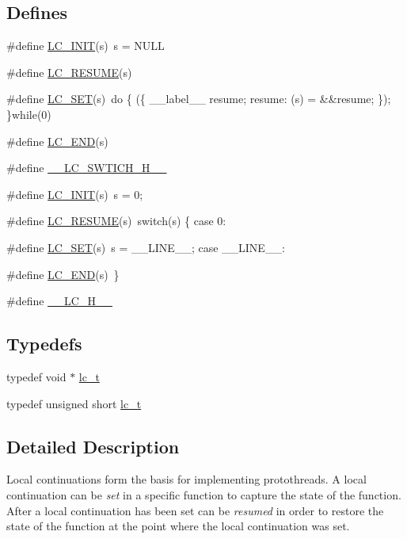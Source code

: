\subsection*{Defines}
\begin{DoxyCompactItemize}
\item 
\#define \hyperlink{group__lc_ga2c1bb4fa6d7a6ff951a41c73fc721109}{LC\_\-INIT}(s)~s = NULL
\item 
\#define \hyperlink{group__lc_ga1ec8b8f4710dce1fa7fb87d3a31541ae}{LC\_\-RESUME}(s)
\item 
\#define \hyperlink{group__lc_gad8eec328a4868d767f0c00c8d1c6cfc1}{LC\_\-SET}(s)~do \{ (\{ \_\-\_\-label\_\-\_\- resume; resume: (s) = \&\&resume; \}); \}while(0)
\item 
\#define \hyperlink{group__lc_gaca51ceb2f5d855dfde55bcedf8d3b92d}{LC\_\-END}(s)
\item 
\#define \hyperlink{group__lc_ga44311ecc30759ca38b4069182247bdae}{\_\-\_\-LC\_\-SWTICH\_\-H\_\-\_\-}
\item 
\#define \hyperlink{group__lc_ga2c1bb4fa6d7a6ff951a41c73fc721109}{LC\_\-INIT}(s)~s = 0;
\item 
\#define \hyperlink{group__lc_ga1ec8b8f4710dce1fa7fb87d3a31541ae}{LC\_\-RESUME}(s)~switch(s) \{ case 0:
\item 
\#define \hyperlink{group__lc_gad8eec328a4868d767f0c00c8d1c6cfc1}{LC\_\-SET}(s)~s = \_\-\_\-LINE\_\-\_\-; case \_\-\_\-LINE\_\-\_\-:
\item 
\#define \hyperlink{group__lc_gaca51ceb2f5d855dfde55bcedf8d3b92d}{LC\_\-END}(s)~\}
\item 
\#define \hyperlink{group__lc_ga28687499cf5b5681fb09ba1c184e09a8}{\_\-\_\-LC\_\-H\_\-\_\-}
\end{DoxyCompactItemize}
\subsection*{Typedefs}
\begin{DoxyCompactItemize}
\item 
typedef void $\ast$ \hyperlink{group__lc_ga2bdc4b7b4038454a79f1b2a94a6d2a98}{lc\_\-t}
\item 
typedef unsigned short \hyperlink{group__lc_ga3983e0c026396d5c4506779d770007ba}{lc\_\-t}
\end{DoxyCompactItemize}


\subsection{Detailed Description}
Local continuations form the basis for implementing protothreads. A local continuation can be {\itshape set\/} in a specific function to capture the state of the function. After a local continuation has been set can be {\itshape resumed\/} in order to restore the state of the function at the point where the local continuation was set. 


